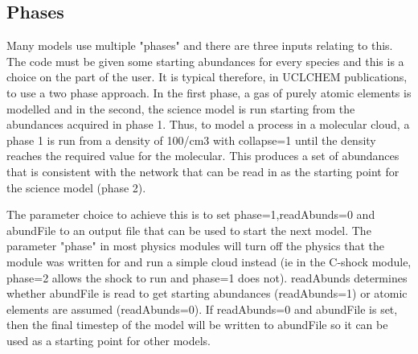 \documentclass{llncs}
\begin{document}
\subsection{Phases}
Many models use multiple "phases" and there are three inputs relating to this. The code must be given some starting abundances for every species and this is a choice on the part of the user. It is typical therefore, in UCLCHEM publications, to use a two phase approach. In the first phase, a gas of purely atomic elements is modelled and in the second, the science model is run starting from the abundances acquired in phase 1. Thus, to model a process in a molecular cloud, a phase 1 is run from a density of 100/cm3 with collapse=1 until the density reaches the required value for the molecular. This produces a set of abundances that is consistent with the network that can be read in as the starting point for the science model (phase 2).\par
%
The parameter choice to achieve this is to set phase=1,readAbunds=0 and abundFile to an output file that can be used to start the next model. The parameter "phase" in most physics modules will turn off the physics that the module was written for and run a simple cloud instead (ie in the C-shock module, phase=2 allows the shock to run and phase=1 does not). readAbunds determines whether abundFile is read to get starting abundances (readAbunds=1) or atomic elements are assumed (readAbunds=0). If readAbunds=0 and abundFile is set, then the final timestep of the model will be written to abundFile so it can be used as a starting point for other models.  
%
\end{document}
